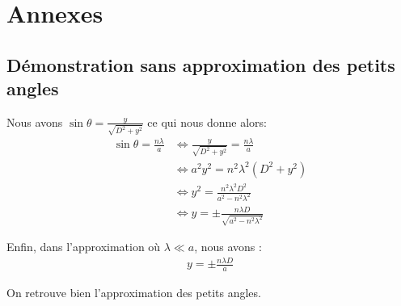 \documentclass[12pt]{article}
\begin{document}
\section*{Annexes}
\subsection{Démonstration sans approximation des petits angles}
Nous avons $\sin \theta = \frac{y}{\sqrt{D^2+y^2}}$ ce qui nous donne alors:
\begin{align*}
    \sin \theta = \frac{n\lambda}{a} & \Leftrightarrow \frac{y}{\sqrt{D^2+y^2}} = \frac{n\lambda}{a} \\
    & \Leftrightarrow a^2y^2 = n^2 \lambda ^2 \left( D^2 + y^2 \right) \\
    & \Leftrightarrow y^2 = \frac{n^2 \lambda^2 D^2}{a^2 - n^2 \lambda^2} \\
    & \Leftrightarrow y = \pm \frac{n \lambda D}{\sqrt{a^2 - n^2 \lambda^2}}
\end{align*}

Enfin, dans l'approximation où $\lambda \ll a$, nous avons :
\begin{align}
    y = \pm \frac{n \lambda D}{a}
\end{align}

On retrouve bien l'approximation des petits angles.
\end{document}
